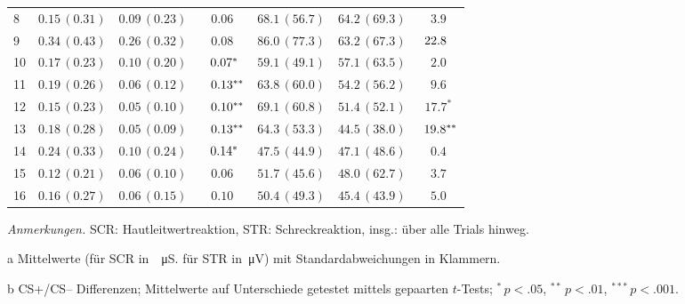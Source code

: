 \begin{table}[bth]
\begin{threeparttable}
\begin{tabularx}{\textwidth}{lCCCCCC}
				8  &$0.15\,(0.31)$ &$0.09\,(0.23)$&$0.06$& $68.1\,(56.7)$& $64.2\,(69.3)$ &$3.9$ \\ 
				9  &$0.34\,(0.43)$ &$0.26\,(0.32)$&$0.08$& $86.0\,(77.3)$& $63.2\,(67.3)$ &$\hspace*{-0.45em}22.8$ \\ 
				10 &$0.17\,(0.23)$ &$0.10\,(0.20)$&$\hspace*{+0.45em}0.07^{*}$& $59.1\,(49.1)$& $57.1\,(63.5)$ &$2.0$  \\ 
				11 &$0.19\,(0.26)$ &$0.06\,(0.12)$&$\hspace*{+0.9em}0.13^{**}$& $63.8\,(60.0)$& $54.2\,(56.2)$ &$9.6$ \\ 
				12 &$0.15\,(0.23)$ &$0.05\,(0.10)$&$\hspace*{+0.9em}0.10^{**}$& $69.1\,(60.8)$& $51.4\,(52.1)$ &$17.7^{*}$ \\ 
				13 &$0.18\,(0.28)$ &$0.05\,(0.09)$&$\hspace*{+0.9em}0.13^{**}$& $64.3\,(53.3)$& $44.5\,(38.0)$ &$\hspace*{0.45em}19.8^{**}$  \\
				14 &$0.24\,(0.33)$ &$0.10\,(0.24)$&$\hspace*{+0.45em}0.14^{*}$& $47.5\,(44.9)$& $47.1\,(48.6)$ &$0.4$\\ 
				15 &$0.12\,(0.21)$ &$0.06\,(0.10)$&$0.06$& $51.7\,(45.6)$& $48.0\,(62.7)$ &$3.7$\\ 
				16 &$0.16\,(0.27)$ &$0.06\,(0.15)$&$0.10$& $50.4\,(49.3)$& $45.4\,(43.9)$ &$5.0$  \\[-0.2em]
				\bottomrule
			\end{tabularx}
			\begin{tablenotes}
				\footnotesize{
					\item \textit{Anmerkungen.} SCR: Hautleitwertreaktion, STR: Schreckreaktion, insg.: über alle Trials hinweg.\\
					\item[a] Mittelwerte (für SCR in~\si{\log\micro\siemens}. für STR in~\si{\micro\volt}) mit Standardabweichungen in Klammern.\\
					\item[b] CS+/CS-- Differenzen; Mittelwerte auf Unterschiede getestet mittels gepaarten $t$-Tests; ${}^{*}\, p<.05$, ${}^{**}\, p<.01$, ${}^{***}\, p<.001$.}
			\end{tablenotes}
		\end{threeparttable}
	\end{table}
